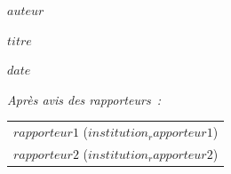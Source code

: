 \documentclass[12pt,twoside]{reedthesis}
\begin{document}
\vspace{5mm}

\begin{center}
{\large\bf $auteur$}
\end{center}

\vspace{3mm}

\begin{center}
{\Large $titre$}
\end{center}


\vspace{10mm}

 $date$

\vspace{5mm}

\noindent
{\small \it Après avis des rapporteurs~: }
\begin{tabular}{l}
{\sc $rapporteur1$} ($institution_rapporteur1$)\vspace{1mm}  \\
{\sc $rapporteur2$} ($institution_rapporteur2$)\\
\end{tabular}

\vspace{8mm}
\end{document}

